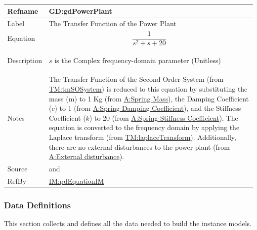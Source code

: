 \documentclass[12pt]{article}
\begin{document}
\medskip
\noindent
\begin{minipage}{\textwidth}
\begin{tabular}{>{\raggedright}p{}>{\raggedright\arraybackslash}p{}}
\toprule \textbf{Refname} & \textbf{GD:gdPowerPlant}
\label{GD:gdPowerPlant}
\\ \midrule
Label & The Transfer Function of the Power Plant
        
\\ \midrule
Equation & \begin{displaymath}
           \frac{1}{s^{2}+s+20}
           \end{displaymath}
\\ \midrule
Description & \begin{symbDescription}
              \item{$s$ is the Complex frequency-domain parameter (Unitless)}
              \end{symbDescription}
\\ \midrule
Notes & The Transfer Function of the Second Order System (from \hyperref[TM:tmSOSystem]{TM:tmSOSystem}) is reduced to this equation by substituting the mass (m) to 1 Kg (from \hyperref[massSpring]{A:Spring Mass}), the Damping Coefficient ($c$) to 1 (from \hyperref[dampingCoeffSpring]{A:Spring Damping Coefficient}), and the Stiffness Coefficient ($k$) to 20 (from \hyperref[stiffnessCoeffSpring]{A:Spring Stiffness Coefficient}). The equation is converted to the frequency domain by applying the Laplace transform (from \hyperref[TM:laplaceTransform]{TM:laplaceTransform}). Additionally, there are no external disturbances to the power plant (from \hyperref[externalDisturb]{A:External disturbance}).
        
\\ \midrule
Source & \cite{pidWiki} and \cite{abbasi2015}
         
\\ \midrule
RefBy & \hyperref[IM:pdEquationIM]{IM:pdEquationIM}
        
\\ \bottomrule
\end{tabular}
\end{minipage}

\subsubsection{Data Definitions}
\label{Sec:DDs}
This section collects and defines all the data needed to build the instance models.
\end{document}
